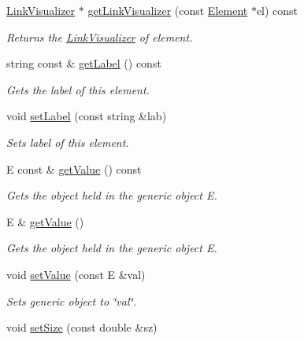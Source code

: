 \begin{DoxyCompactItemize}
\hyperlink{classbridges_1_1datastructure_1_1_link_visualizer}{Link\+Visualizer} $\ast$ \hyperlink{classbridges_1_1datastructure_1_1_element_a5e3b55d5098d72d4a83b68a60584a3a1}{get\+Link\+Visualizer} (const \hyperlink{classbridges_1_1datastructure_1_1_element}{Element} $\ast$el) const
\begin{DoxyCompactList}\small\item\em Returns the \hyperlink{classbridges_1_1datastructure_1_1_link_visualizer}{Link\+Visualizer} of element. \end{DoxyCompactList}\item 
string const  \& \hyperlink{classbridges_1_1datastructure_1_1_element_a44949edf79379a4d48490e98c15992a6}{get\+Label} () const
\begin{DoxyCompactList}\small\item\em Gets the label of this element. \end{DoxyCompactList}\item 
void \hyperlink{classbridges_1_1datastructure_1_1_element_a3a1fe4e3aa100125710c30f6e401e8c3}{set\+Label} (const string \&lab)
\begin{DoxyCompactList}\small\item\em Sets label of this element. \end{DoxyCompactList}\item 
E const  \& \hyperlink{classbridges_1_1datastructure_1_1_element_acf6e068c6b00ff0d20ed42af32ff1f38}{get\+Value} () const
\begin{DoxyCompactList}\small\item\em Gets the object held in the generic object E. \end{DoxyCompactList}\item 
E \& \hyperlink{classbridges_1_1datastructure_1_1_element_abba0b4c03eb6fd08aed17eeb3be5bd1b}{get\+Value} ()
\begin{DoxyCompactList}\small\item\em Gets the object held in the generic object E. \end{DoxyCompactList}\item 
void \hyperlink{classbridges_1_1datastructure_1_1_element_a26f2aceb9eed7195fd55b3538f3c059f}{set\+Value} (const E \&val)
\begin{DoxyCompactList}\small\item\em Sets generic object to \char`\"{}val\char`\"{}. \end{DoxyCompactList}\item 
void \hyperlink{classbridges_1_1datastructure_1_1_element_a3200b0ac712c1720db62d1f0bbcb14be}{set\+Size} (const double \&sz)

\end{DoxyCompactItemize}
